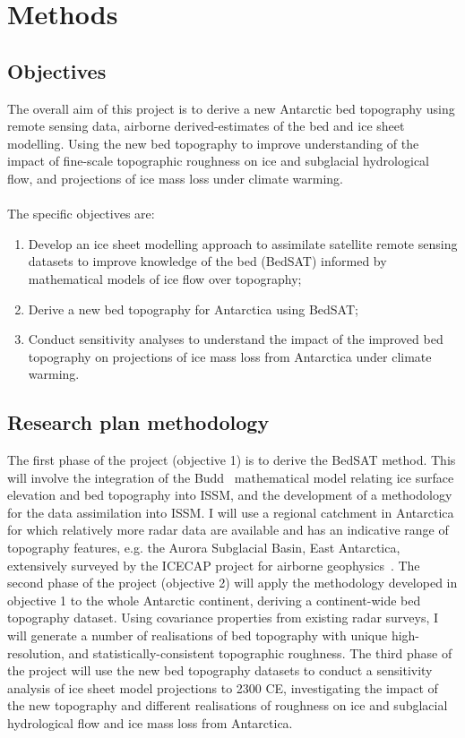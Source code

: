 \chapter{Methods}
\section*{Objectives}

The overall aim of this project is to derive a new Antarctic bed topography using remote sensing data, airborne derived-estimates of the bed and ice sheet modelling. Using the new bed topography to improve understanding of the impact of fine-scale topographic roughness on ice and subglacial hydrological flow, and projections of ice mass loss under climate warming.\\
\\The specific objectives are:
\begin{enumerate}
    \item Develop an ice sheet modelling approach to assimilate satellite remote sensing datasets to improve knowledge of the bed (BedSAT) informed by mathematical models of ice flow over topography;
    \item Derive a new bed topography for Antarctica using BedSAT;
    \item Conduct sensitivity analyses to understand the impact of the improved bed topography on projections of ice mass loss from Antarctica under climate warming.
\end{enumerate}

\section*{Research plan methodology}

The first phase of the project (objective 1) is to derive the BedSAT method. This will involve the integration of the Budd~\cite{Budd_1970} mathematical model relating ice surface elevation and bed topography into ISSM, and the development of a methodology for the data assimilation into ISSM. I will use a regional catchment in Antarctica for which relatively more radar data are available and has an indicative range of topography features, e.g. the Aurora Subglacial Basin, East Antarctica, extensively surveyed by the ICECAP project for airborne geophysics~\cite{Young_2011}. The second phase of the project (objective 2) will apply the methodology developed in objective 1 to the whole Antarctic continent, deriving a continent-wide bed topography dataset. Using covariance properties from existing radar surveys, I will generate a number of realisations of bed topography with unique high-resolution, and statistically-consistent topographic roughness. The third phase of the project will use the new bed topography datasets to conduct a sensitivity analysis of ice sheet model projections to 2300 CE, investigating the impact of the new topography and different realisations of roughness on ice and subglacial hydrological flow and ice mass loss from Antarctica.\\
\newpage
